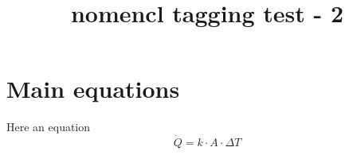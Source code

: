 \documentclass{article}
\title{nomencl tagging test - 2}
\begin{document}
\section*{Main equations}
Here an equation
\begin{equation}\label{eq:heatflux}
    \dot{Q} = k \cdot A \cdot \Delta T
\end{equation}%
%
%
\printnomenclature
\end{document}
